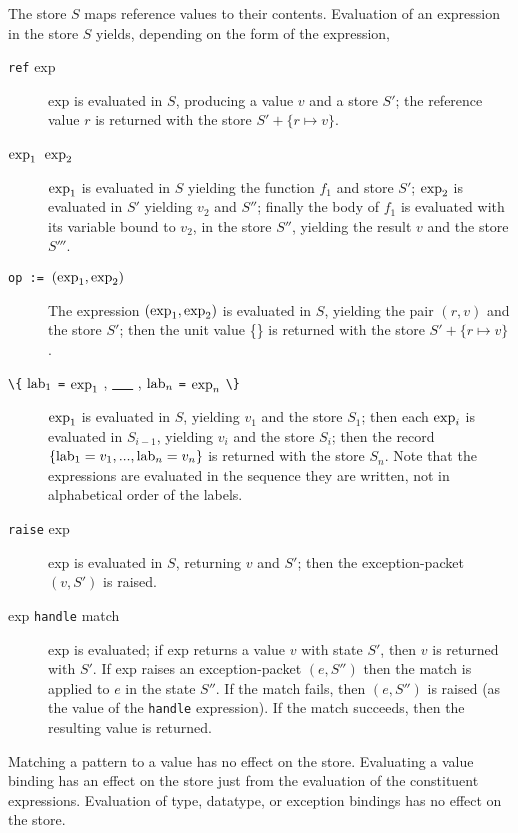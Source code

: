 The store $S$ maps reference values to their contents.  Evaluation of
an expression in the store $S$ yields, depending on the form of the
expression,
\begin{description}
\item[\verb"ref" exp\hfill] exp is evaluated in $S$,
producing a value $v$ and a store $S'$; the 
reference value $r$ is returned with the store $S'+\{r \mapsto v\}$.

\item[${\rm exp}_1$~${\rm exp}_2$\hfill]  ${\rm exp}_1$ is evaluated in $S$
yielding the function $f_1$ and store $S'$;
${\rm exp}_2$ is evaluated in $S'$ yielding $v_2$ and $S''$;
finally the body of $f_1$ is evaluated with its variable bound to $v_2$,
in the store $S''$, yielding the result $v$ and the store $S'''$.

\item[\verb"op := "$({\rm exp}_1,{\rm exp}_2)$\hfill]  The expression 
$({\rm exp}_1,{\rm exp}_2)$ is evaluated in $S$, yielding the pair
$(r,v)$ and the store $S'$; then the unit value \{\} is returned with
the store $S'+\{r \mapsto v\}$.

\item[\protect\verb"\{" ${\rm lab}_1$ \protect\verb"=" ${\rm exp}_1$ , \underline{\ \ \ } , ${\rm lab}_n$ \protect\verb"=" ${\rm exp}_n$ \protect\verb"\}" \hfill]  
${\rm exp}_1$ is evaluated in $S$, yielding $v_1$ and the store
$S_1$; then each ${\rm exp}_i$ is evaluated in $S_{i-1}$, yielding $v_i$ and the store $S_i$; then the record
$\{ {\rm lab}_1 = v_1 , ... , {\rm lab}_n = v_n \}$ is returned with
the store $S_n$.  Note that the expressions are evaluated in the
sequence they are written, not in alphabetical order of the labels.

\item[\protect\verb"raise" exp\hfill]  exp is evaluated in $S$, returning $v$
and $S'$; then the exception-packet $(v,S')$ is raised.

\item[exp \verb"handle" match\hfill]  exp is evaluated; if exp returns a
value $v$ with state $S'$, then $v$ is returned with $S'$.  
If exp raises an exception-packet $(e,S'')$ then
the match is applied to $e$ in the state $S''$.
If the match fails, then $(e,S'')$ is raised
(as the value of the \verb"handle" expression).  If the match
succeeds, then the resulting value is returned.
\end{description}

Matching a pattern to a value has no effect on the store.  Evaluating
a value binding has an effect on the store just from the evaluation of
the constituent expressions.  Evaluation of type, datatype, or exception
bindings has no effect on the store.

